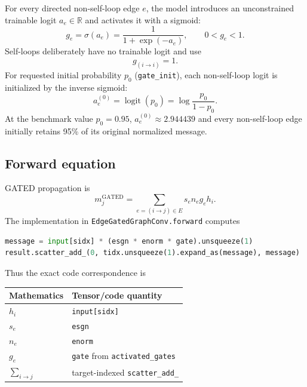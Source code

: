 \documentclass[11pt]{article}
\newcommand{\code}[1]{\texttt{#1}}
\begin{document}
For every directed non-self-loop edge $e$, the model introduces an unconstrained
trainable logit $a_e\in\mathbb{R}$ and activates it with a sigmoid:
\begin{equation}
  g_e = \sigma(a_e)=\frac{1}{1+\exp(-a_e)}, \qquad 0<g_e<1.
  \label{eq:sigmoid}
\end{equation}
Self-loops deliberately have no trainable logit and use
\begin{equation}
  g_{(i\to i)}=1.
  \label{eq:selfloop}
\end{equation}
For requested initial probability $p_0$ (\code{gate\_init}), each non-self-loop
logit is initialized by the inverse sigmoid:
\begin{equation}
  a_e^{(0)}=\operatorname{logit}(p_0)
  =\log\frac{p_0}{1-p_0}.
  \label{eq:init}
\end{equation}
At the benchmark value $p_0=0.95$, $a_e^{(0)}\approx2.944439$ and every
non-self-loop edge initially retains 95\% of its original normalized message.

\subsection{Forward equation}

GATED propagation is
\begin{equation}
  m_j^{\mathrm{GATED}}
  =\sum_{e=(i\to j)\in E}s_e n_e g_e h_i.
  \label{eq:gated}
\end{equation}
The implementation in \code{EdgeGatedGraphConv.forward} computes
\begin{lstlisting}[language=Python]
message = input[sidx] * (esgn * enorm * gate).unsqueeze(1)
result.scatter_add_(0, tidx.unsqueeze(1).expand_as(message), message)
\end{lstlisting}
Thus the exact code correspondence is
\begin{center}
\begin{tabular}{ll}
\toprule
Mathematics & Tensor/code quantity \\
\midrule
$h_i$ & \code{input[sidx]} \\
$s_e$ & \code{esgn} \\
$n_e$ & \code{enorm} \\
$g_e$ & \code{gate} from \code{activated\_gates} \\
$\sum_{i\to j}$ & target-indexed \code{scatter\_add\_} \\
\bottomrule
\end{tabular}
\end{center}
\end{document}
